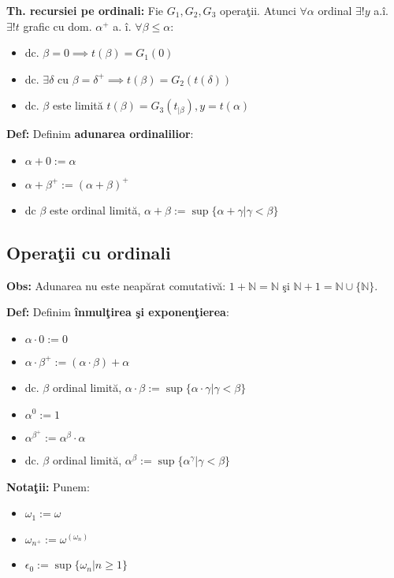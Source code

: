 \documentclass{article}
\begin{document}
\textbf{Th. recursiei pe ordinali:} Fie $G_1,G_2,G_3$ opera\c tii. Atunci $\forall \alpha$ ordinal $\exists ! y$ a.\^ i. $\exists ! t$ grafic cu dom. $\alpha^+$ a. \^ i. $\forall \beta \leq \alpha$:
\begin{itemize}
    \item dc. $\beta=0\implies t(\beta)=G_1(0)$
    \item dc. $\exists \delta $ cu $\beta=\delta^+ \implies t(\beta)=G_2(t(\delta))$
    \item dc. $\beta$ este limit\u a $t(\beta)=G_3(t_{|\beta}), y=t(\alpha) $
\end{itemize}

\textbf{Def:} Definim \textbf{adunarea ordinalilior}:
\begin{itemize}
    \item $\alpha+0:=\alpha$
    \item $\alpha+\beta^+:=(\alpha+\beta)^+$
    \item dc $\beta$ este ordinal limit\u a, $\alpha+\beta:=\sup\{\alpha+\gamma|\gamma<\beta\}$
\end{itemize}

\subsection{Opera\c tii cu ordinali}

\textbf{Obs:} Adunarea nu este neap\u arat comutativ\u a: $1+\mathbb N=\mathbb N$ \c si $\mathbb N+1=\mathbb N\cup \{\mathbb N\}$.

\textbf{Def:} Definim \textbf{\^ inmul\c tirea \c si exponen\c tierea}:
\begin{itemize}
    \item $\alpha \cdot 0:=0$
    \item $\alpha \cdot \beta^+:=(\alpha\cdot\beta)+\alpha$
    \item dc. $\beta$ ordinal limit\u a, $\alpha\cdot\beta:=\sup\{\alpha\cdot\gamma|\gamma<\beta\}$
    \item $\alpha^0:=1$
    \item $\alpha^{\beta^+}:=\alpha^\beta\cdot\alpha$
    \item dc. $\beta$ ordinal limit\u a, $\alpha^\beta:=\sup\{\alpha^\gamma|\gamma<\beta\}$
\end{itemize}

\textbf{Nota\c tii:} Punem:
\begin{itemize}
    \item $\omega_1:=\omega$
    \item $\omega_{n^+}:=\omega^(\omega_n)$
    \item $\epsilon_0:=\sup\{\omega_n|n\geq 1\}$
\end{itemize}
\end{document}
